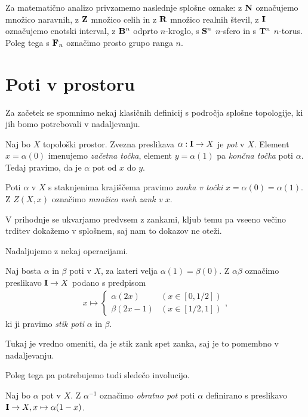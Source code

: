 \documentclass[11pt, a4paper]{article}
\begin{document}
Za matematično analizo privzamemo naslednje splošne oznake: z $\N$ označujemo množico naravnih, z $\Z$ množico celih in z $\R$ množico realnih števil, z $\I$ označujemo enotski interval, z $\B^n$ odprto $n$-kroglo, s $\S^n$ $n$-sfero in s $\T^n$ $n$-torus. Poleg tega s $\F_n$ označimo prosto grupo ranga $n$.

\section{Poti v prostoru}


Za začetek se spomnimo nekaj klasičnih definicij s področja splošne topologije, ki jih bomo potrebovali v nadaljevanju.


\begin{definicija}
    Naj bo $X$ topološki prostor. Zvezna preslikava $\alpha : \I \to X$ je \textit{pot} v $X$. Element $x = \alpha(0)$ imenujemo \textit{začetna točka}, element $y = \alpha(1)$ pa \textit{končna točka} poti $\alpha$. Tedaj pravimo, da je $\alpha$ pot od $x$ do $y$.

    Poti $\alpha$ v $X$ s staknjenima krajiščema pravimo \textit{zanka v točki} $x = \alpha(0) = \alpha(1)$. Z $Z(X, x)$ označimo \textit{množico vseh zank v} $x$.
\end{definicija}


V prihodnje se ukvarjamo predvsem z zankami, kljub temu pa vseeno večino trditev dokažemo v splošnem, saj nam to dokazov ne oteži.

Nadaljujemo z nekaj operacijami.


\begin{definicija}
    Naj bosta $\alpha$ in $\beta$ poti v $X$, za kateri velja $\alpha(1) = \beta(0)$. Z $\alpha\beta$ označimo preslikavo $\I \to X$ podano s predpisom
    \begin{align*}
        x \mapsto
        \begin{cases}
            \alpha(2x) & (x \in [0, 1/2]) \\
            \beta(2x - 1) & (x \in [1/2, 1])
        \end{cases},
    \end{align*}
    ki ji pravimo \textit{stik poti} $\alpha$ in $\beta$.
\end{definicija}


Tukaj je vredno omeniti, da je stik zank spet zanka, saj je to pomembno v nadaljevanju.

Poleg tega pa potrebujemo tudi sledečo involucijo.


\begin{definicija}
    Naj bo $\alpha$ pot v $X$. Z $\alpha^{-1}$ označimo \textit{obratno pot} poti $\alpha$ definirano s preslikavo $\I \to X, x \mapsto \alpha(1 - x)$.
\end{definicija}
\end{document}
